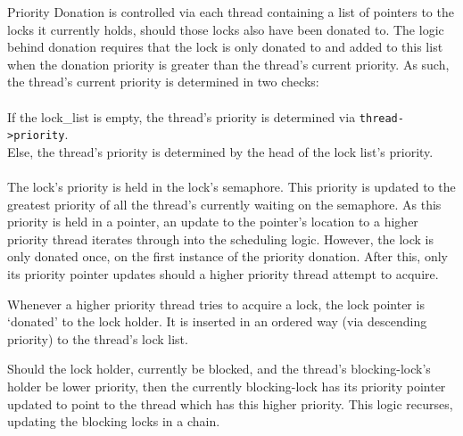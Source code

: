 \documentclass[a4wide, 11pt]{article}
\newcommand{\tx}{\texttt}
\begin{document}
Priority Donation is controlled via each thread containing a list
of pointers to the locks it currently holds, should those locks also have been donated to. The logic behind donation requires that the lock is only donated to and added to this list when the donation priority is greater than the thread's current priority. As such, the thread's current priority is determined in two checks:
\\\\
If the lock\_list is empty, the thread's priority is determined via
\tx{thread->priority}.
\\
Else, the thread's priority is determined by the head of the lock list's 
priority.
\\\\
The lock's priority is held in the lock's semaphore. This priority is updated 
to the greatest priority of all the thread's currently waiting on the semaphore.
 As this priority is held in a pointer, an update to the pointer's location to 
a higher priority thread iterates through into the scheduling logic. However, 
the lock is only donated once, on the first instance of the priority donation. 
After this, only its priority pointer updates should a higher priority thread 
attempt to acquire.

Whenever a higher priority thread tries to acquire a lock, the lock pointer is 
`donated' to the lock holder. It is inserted in an ordered way (via descending 
priority) to the thread's lock list.

Should the lock holder, currently be blocked, and the thread's blocking-lock's 
holder be lower priority, then the currently blocking-lock has its priority
pointer updated to point to the thread which has this higher priority. This 
logic recurses, updating the blocking locks in a chain.
\end{document}
